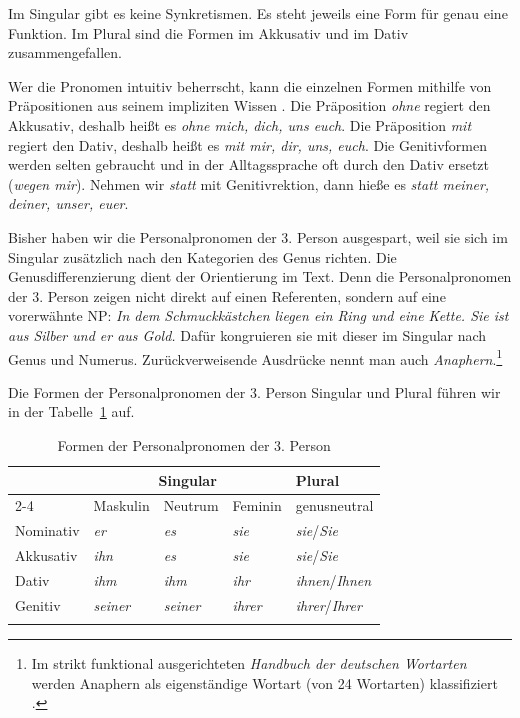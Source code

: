 Im Singular gibt es keine Synkretismen. Es steht jeweils eine Form für genau eine Funktion. Im Plural sind die Formen im Akkusativ und im Dativ zusammengefallen. 

Wer die Pronomen intuitiv beherrscht, kann die einzelnen Formen mithilfe von Präpositionen aus seinem impliziten Wissen . Die Präposition \textit{ohne} regiert den Akkusativ, deshalb heißt es \textit{ohne mich, dich, uns euch}. Die Präposition \textit{mit} regiert den Dativ, deshalb heißt es \textit{mit mir, dir, uns, euch}. Die Genitivformen werden selten gebraucht und in der Alltagssprache oft durch den Dativ ersetzt (\textit{wegen mir}). Nehmen wir \textit{statt} mit Genitivrektion, dann hieße es \textit{statt meiner, deiner, unser, euer}.

Bisher haben wir die Personalpronomen der 3. Person ausgespart, weil sie sich im Singular zusätzlich nach den Kategorien des Genus richten. Die Genusdifferenzierung dient der Orientierung im Text. Denn die Personalpronomen der 3. Person zeigen nicht direkt auf einen Referenten, sondern auf eine vorerwähnte NP: \textit{In dem Schmuckkästchen liegen ein Ring und eine Kette. Sie ist aus Silber und er aus Gold.} Dafür kongruieren sie mit dieser im Singular nach Genus und Numerus. Zurückverweisende Ausdrücke nennt man auch \textit{Anaphern}.\footnote{Im strikt funktional ausgerichteten \textit{Handbuch der deutschen Wortarten} werden Anaphern als eigenständige Wortart (von 24 Wortarten) klassifiziert \citep[265--292]{RN673}.}

Die Formen der Personalpronomen der 3. Person Singular und Plural führen wir in der Tabelle~\ref{tab:Pers_Prn_3} auf.

\begin{table}
  \centering
  \begin{tabular}{l l l l l}
    \lsptoprule
     & \multicolumn{3}{c}{Singular} & Plural \\
     \cmidrule{2-4}
     & Maskulin & Neutrum & Feminin & genusneutral\\   
    \hline
    Nominativ & \textit{er} & \textit{es} & \textit{sie} &\textit{sie}/\textit{Sie} \\
   
    Akkusativ & \textit{ihn} & \textit{es} & \textit{sie} &\textit{sie}/\textit{Sie} \\
    
    Dativ & \textit{ihm} & \textit{ihm} & \textit{ihr} &\textit{ihnen}/\textit{Ihnen}  \\
    
    Genitiv & \textit{seiner} & \textit{seiner} & \textit{ihrer} &\textit{ihrer}/\textit{Ihrer}  \\
    \lspbottomrule 
  \end{tabular}
  \caption{Formen der Personalpronomen der 3. Person}
  \label{tab:Pers_Prn_3}
\end{table}

